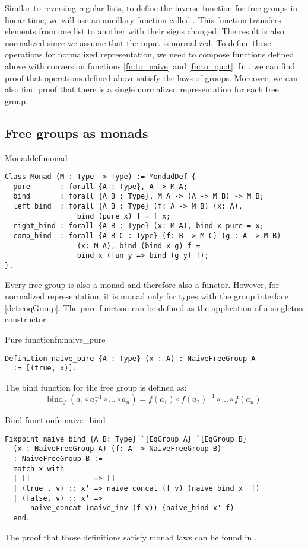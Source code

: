 Similar to reversing regular lists, to define the inverse function for free groups  in linear time, we will use an ancillary function called . This function transfers elements from one list to another with their signs changed. The result is also normalized since we assume that the input is normalized.
To define these operations for normalized representation, we need to compose functions defined above with conversion functions \ref{fn:to_naive} and \ref{fn:to_quot}. In , we can find proof that operations defined above satisfy the laws of groups. Moreover, we can also find proof that there is a single normalized representation for each free group.  
\subsection{Free groups as monads}
\begin{defi}{Monad}{def:monad}
\begin{verbatim}
Class Monad (M : Type -> Type) := MondadDef {
  pure       : forall {A : Type}, A -> M A;
  bind       : forall {A B : Type}, M A -> (A -> M B) -> M B;
  left_bind  : forall {A B : Type} (f: A -> M B) (x: A), 
                 bind (pure x) f = f x; 
  right_bind : forall {A B : Type} (x: M A), bind x pure = x; 
  comp_bind  : forall {A B C : Type} (f: B -> M C) (g : A -> M B) 
                 (x: M A), bind (bind x g) f = 
                 bind x (fun y => bind (g y) f);
}.
\end{verbatim}
\end{defi}
Every free group is also a monad and therefore also a functor. However, for normalized representation, it is monad only for types with the group interface \ref{def:coqGroup}. The pure function can be defined as the application of a singleton constructor.
\begin{func}{Pure function}{fn:naive_pure}
\begin{verbatim}
Definition naive_pure {A : Type} (x : A) : NaiveFreeGroup A 
  := [(true, x)].
\end{verbatim}
\end{func}
The bind function for the free group is defined as:
$$
    \textrm{bind}_f \; (a_1 \circ a_2^{-1} \circ \dots \circ a_n) = f (a_1) \circ f (a_2) ^{-1} \circ \dots \circ f (a_n)
$$
\begin{func}{Bind function}{fn:naive_bind}
\begin{verbatim}
Fixpoint naive_bind {A B: Type} `{EqGroup A} `{EqGroup B} 
  (x : NaiveFreeGroup A) (f: A -> NaiveFreeGroup B) 
  : NaiveFreeGroup B :=
  match x with
  | []               => []
  | (true , v) :: x' => naive_concat (f v) (naive_bind x' f)
  | (false, v) :: x' => 
      naive_concat (naive_inv (f v)) (naive_bind x' f)
  end.
\end{verbatim}
\end{func}
The proof that those definitions satisfy monad laws can be found in .
